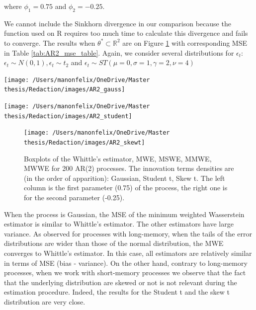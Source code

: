 \documentclass[
  11pt,
]{article}
\begin{document}
where \(\phi_1 = 0.75\) and \(\phi_2 = -0.25\).

We cannot include the Sinkhorn divergence in our comparison because the
function used on R requires too much time to calculate this divergence
and fails to converge. The results when
\(\theta^* \subset \mathbb{R}^2\) are on Figure \ref{fig:box_ar2} with
corresponding MSE in Table \ref{tab:AR2_mse_table}. Again, we consider
several distributions for \(\epsilon_t\):
\(\epsilon_t \sim N(0,1), \epsilon_t \sim t_2\) and
\(\epsilon_t \sim S T(\mu = 0, \sigma = 1, \gamma = 2, \nu = 4)\)

\begin{center}\texttt{[image: /Users/manonfelix/OneDrive/Master thesis/Redaction/images/AR2\_gauss]} \end{center}

\begin{center}\texttt{[image: /Users/manonfelix/OneDrive/Master thesis/Redaction/images/AR2\_student]} \end{center}

\begin{figure}

{\centering \texttt{[image: /Users/manonfelix/OneDrive/Master thesis/Redaction/images/AR2\_skewt]} 

}

\caption{Boxplots of the Whittle's estimator, MWE, MSWE, MMWE, MWWE for 200 AR(2) processes. The innovation terms densities are (in the order of apparition): Gaussian, Student t, Skew t. The left column is the first parameter (0.75) of the process, the right one is for the second parameter (-0.25).}\label{fig:box_ar2}
\end{figure}

When the process is Gaussian, the MSE of the minimum weighted
Wasserstein estimator is similar to Whittle's estimator. The other
estimators have large variance. As observed for processes with
long-memory, when the tails of the error distributions are wider than
those of the normal distribution, the MWE converges to Whittle's
estimator. In this case, all estimators are relatively similar in terms
of MSE (bias - variance). On the other hand, contrary to long-memory
processes, when we work with short-memory processes we observe that the
fact that the underlying distribution are skewed or not is not relevant
during the estimation procedure. Indeed, the results for the Student t
and the skew t distribution are very close.
\end{document}
